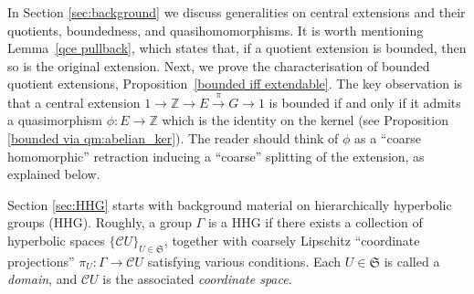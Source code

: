 \documentclass[svgnames]{amsart}
\theoremstyle{plain}
\theoremstyle{definition}
\newcommand{\cal}[1]{\mathcal{#1}}
\newcommand{\Z}{\mathbb{Z}}
\newcommand{\frakS}{\mathfrak{S}}
\newcommand{\C}{\cal C}
\begin{document}
In Section \ref{sec:background} we discuss generalities on central extensions and their quotients, boundedness, and quasihomomorphisms. It is worth mentioning Lemma~\ref{qce pullback}, which states that, if a quotient extension is bounded, then so is the original extension. Next, we prove the characterisation of bounded quotient extensions, Proposition~\ref{bounded iff extendable}. The key observation is that a central extension $1 \to \Z \to E \xrightarrow{\pi} G \to 1$ is bounded if and only if it admits a quasimorphism $\phi\colon E\to \Z$ which is the identity on the kernel (see Proposition \ref{bounded via qm:abelian_ker}). The reader should think of $\phi$ as a ``coarse homomorphic'' retraction inducing a ``coarse'' splitting of the extension, as explained below.
\par\medskip
Section \ref{sec:HHG} starts with background material on hierarchically hyperbolic groups (HHG). Roughly, a group $\Gamma$ is a HHG if there exists a collection of hyperbolic spaces $\{\C U\}_{U\in \frakS}$, together with coarsely Lipschitz ``coordinate projections'' $\pi_U\colon \Gamma\to \C U$ satisfying various conditions. Each $U\in \frakS$ is called a \emph{domain}, and $\C  U$ is the associated \emph{coordinate space}.
\end{document}
